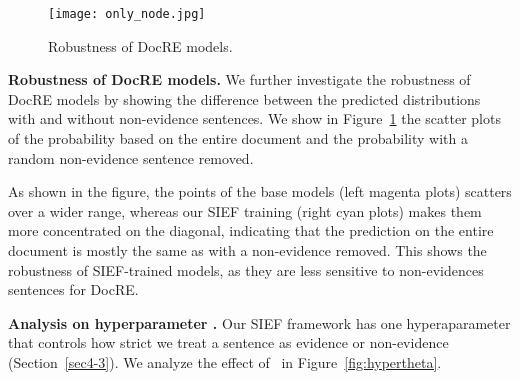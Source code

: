 \documentclass[11pt]{article}
\begin{document}
\begin{table}[!t]
\centering
{}\vspace{-.1cm}
\caption{Results of the evidence prediction on the development set of DocRED.}\vspace{-.2cm}
\label{tab:performanceevidence}
\end{table}

\begin{figure}[!t]\vspace{-.3cm}
  \centering
  \texttt{[image: only\_node.jpg]} \vspace{-.6cm}
  \caption{Robustness of DocRE models.}\vspace{-.2cm}
  \label{fig:data_point_dis}
\end{figure}

\textbf{Robustness of DocRE models.}
We further investigate the robustness of DocRE models by showing the difference between the predicted distributions with and without non-evidence sentences. We show  in Figure~\ref{fig:data_point_dis}  the scatter plots of the probability  based on the entire document and the probability  with a random non-evidence sentence removed. 

As shown in the figure, the points of the base models (left magenta plots) scatters over a wider range, whereas our SIEF training (right cyan plots) makes them more concentrated on the diagonal, indicating that the prediction  on the entire document is mostly the same as  with a non-evidence removed. This shows the robustness of SIEF-trained models, as they are less sensitive to non-evidences sentences for DocRE.

\textbf{Analysis on hyperparameter .} 
Our SIEF framework has one hyperaparameter  that controls how strict we treat a sentence as evidence or non-evidence (Section~\ref{sec4-3}). We analyze the effect of~ in Figure~\ref{fig:hypertheta}. 
\end{document}
